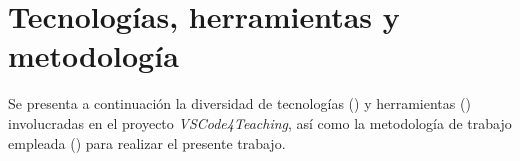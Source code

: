 \chapter{Tecnologías, herramientas y metodología}
\label{cap:tecnolHerramMetodo}

Se presenta a continuación la diversidad de tecnologías () y herramientas () involucradas en el proyecto \textit{VSCode4Teaching}, así como la metodología de trabajo empleada () para realizar el presente trabajo.



